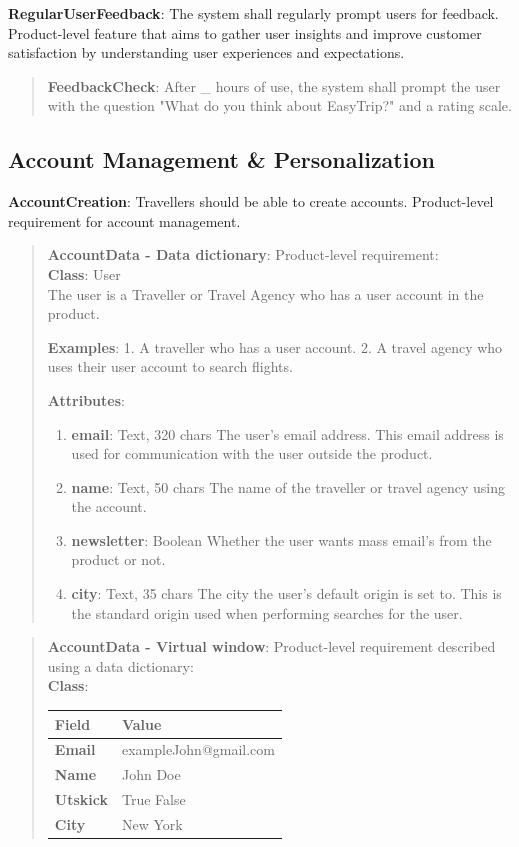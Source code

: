 \textbf{RegularUserFeedback}: The system shall regularly prompt users for feedback. Product-level feature that aims to gather user insights and improve customer satisfaction by understanding user experiences and expectations. 
\begin{quote}
    \textbf{FeedbackCheck}: After \_ hours of use, the system shall prompt the user with the question "What do you think about EasyTrip?" and a rating scale. 
\end{quote}

\subsection{Account Management \& Personalization}
\textbf{AccountCreation}: Travellers should be able to create accounts. Product-level requirement for account management.
\begin{quote}
    \textbf{AccountData - Data dictionary}: Product-level requirement: \\\textbf{Class}: User\\
    The user is a Traveller or Travel Agency who has a user account in the product.
    
    \textbf{Examples}:
    1. A traveller who has a user account.
    2. A travel agency who uses their user account to search flights.
    
    \textbf{Attributes}:
    \begin{enumerate}
        \item \textbf{email}:      Text, 320 chars
        The user's email address. This email address is used for communication with the user outside the product.
        \item \textbf{name}:       Text, 50 chars
                The name of the traveller or travel agency using the account.
        \item \textbf{newsletter}: Boolean
        Whether the user wants mass email's from the product or not.
        \item \textbf{city}:       Text, 35 chars
        The city the user's default origin is set to. This is the standard origin used when performing searches for the user.
    \end{enumerate}    
\end{quote}

\begin{quote}
    \textbf{AccountData - Virtual window}: Product-level requirement described using a data dictionary: \\\textbf{Class}: \begin{longtable}{|p{3cm}|p{9cm}|}
        \hline
        \rowcolor{headergray}
        \textbf{Field} & \textbf{Value} \\ \hline
        \textbf{Email} & exampleJohn@gmail.com \\ \hline
        \textbf{Name} & John Doe \\ \hline
        \textbf{Utskick} & True \hspace{1em} False \\ \hline
        \textbf{City} & New York \\ \hline
    \end{longtable}
\end{quote}

